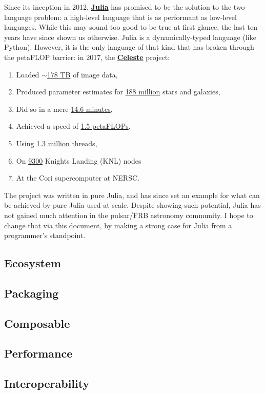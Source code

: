 \documentclass[11pt, a4paper]{tufte-handout}
\newcommand{\Julia}{\href{https://julialang.org/}{\textbf{Julia}}}
\newcommand{\Celeste}{\href{https://github.com/jeff-regier/Celeste.jl}{\textbf{Celeste}}}
\begin{document}
Since its inception in 2012, \Julia{} has promised to be the solution to the
two-language problem: a high-level language that is as performant as low-level
languages. While this may sound too good to be true at first glance, the last
ten years have since shown us otherwise. Julia is a dynamically-typed language
(like Python). However, it is the only language of that kind that has broken
through the petaFLOP barrier: in 2017, the \Celeste{} project:

\pagebreak

\begin{enumerate}
    \item Loaded \underline{$\sim$178 TB} of image data,
    \item Produced parameter estimates for \underline{188 million} stars and galaxies,
    \item Did so in a mere \underline{14.6 minutes},
    \item Achieved a speed of \underline{1.5 petaFLOPs},
    \item Using \underline{1.3 million} threads,
    \item On \underline{9300} Knights Landing (KNL) nodes
    \item At the Cori supercomputer at NERSC.
\end{enumerate}

The project was written in pure Julia, and has since set an example for what can
be achieved by pure Julia used at scale. Despite showing such potential, Julia
has not gained much attention in the pulsar/FRB astronomy community. I hope to
change that via this document, by making a strong case for Julia from a
programmer's standpoint.

\subsection{Ecosystem}
\subsection{Packaging}
\subsection{Composable}
\subsection{Performance}
\subsection{Interoperability}
\end{document}

